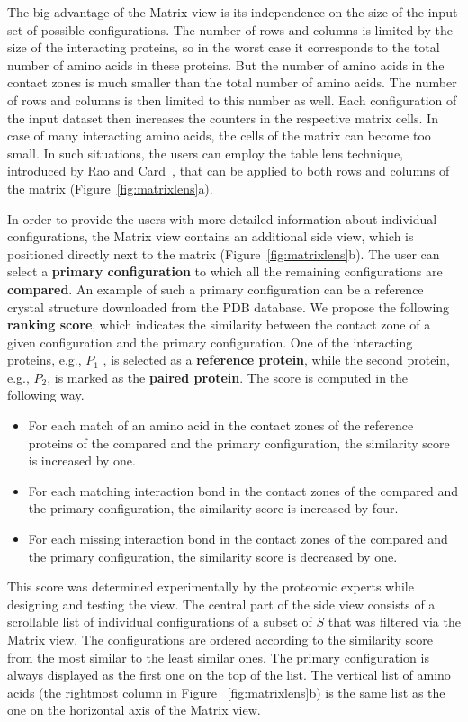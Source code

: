 \documentclass{bmcart}
\def\MatView {Matrix view\xspace}
\begin{document}
The big advantage of the \MatView is its independence on the size of the input set of possible configurations.
The number of rows and columns is limited by the size of the interacting proteins, so in the worst case it corresponds to the total number of amino acids in these proteins.
But the number of amino acids in the contact zones is much smaller than the total number of amino acids.
The number of rows and columns is then limited to this number as well.
Each configuration of the input dataset then increases the counters in the respective matrix cells.
In case of many interacting amino acids, the cells of the matrix can become too small.
In such situations, the users can employ the table lens technique, introduced by Rao and Card~\cite{Rao1994}, that can be applied to both rows and columns of the matrix (Figure~\ref{fig:matrixlens}a).

In order to provide the users with more detailed information about individual configurations, the \MatView contains an additional side view, which is positioned directly next to the matrix (Figure~\ref{fig:matrixlens}b).
The user can select a \textbf{primary configuration} to which all the remaining configurations are \textbf{compared}.
An example of such a primary configuration can be a reference crystal structure downloaded from the PDB database.
We propose the following \textbf{ranking score}, which indicates the similarity between the contact zone of a given configuration and the primary configuration.
One of the interacting proteins, e.g., $P_1$ , is selected as a \textbf{reference protein}, while the second protein, e.g., $P_2$, is marked as the \textbf{paired protein}.
The score is computed in the following way.
\begin{itemize}
\item For each match of an amino acid in the contact zones of the reference proteins of the compared and the primary configuration, the similarity score is increased by one.
\item For each matching interaction bond in the contact zones of the compared and the primary configuration, the similarity score is increased by four.
\item For each missing interaction bond in the contact zones of the compared and the primary configuration, the similarity score is decreased by one.
\end{itemize}
This score was determined experimentally by the proteomic experts while designing and testing the view. 
The central part of the side view consists of a scrollable list of individual configurations of a subset of $S$ that was filtered via the \MatView.
The configurations are ordered according to the similarity score from the most similar to the least similar ones.
The primary configuration is always displayed as the first one on the top of the list.
The vertical list of amino acids (the rightmost column in Figure ~\ref{fig:matrixlens}b) is the same list as the one on the horizontal axis of the \MatView.
\end{document}
